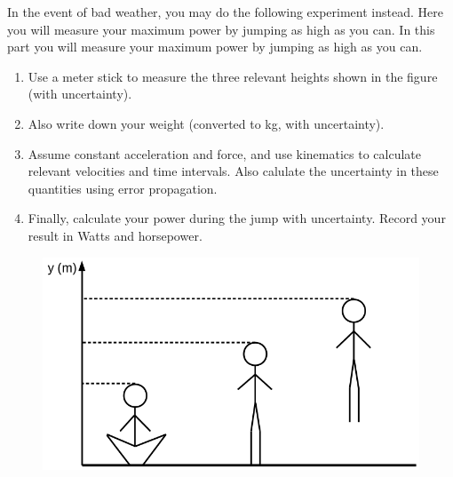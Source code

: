 In the event of bad weather, you may do the following experiment instead.
Here you will measure your maximum power by jumping as high as you can.
In this part you will measure your maximum power by jumping as high as you can.
\begin{enumerate}
\item Use a meter stick to measure the three relevant heights shown in the figure (with uncertainty).
\item Also write down your weight (converted to kg, with uncertainty).
\item Assume constant acceleration and force, and use kinematics to calculate relevant velocities and time intervals. Also calulate the uncertainty in these quantities using error propagation.
\item Finally, calculate your power during the jump with uncertainty. Record your result in Watts and horsepower.
\end{enumerate}

\begin{figure}[H]
\includegraphics[scale=0.50]{figures/workPower/fig2.png}
\end{figure}

\pagebreak \clearpage

